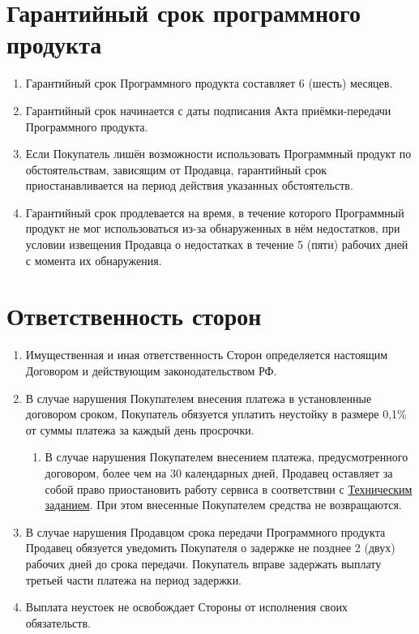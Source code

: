 \documentclass[12pt]{article}
\newcommand{\TZ}[1][Техническое задание]{\hyperref[link-tz]{#1}}
\begin{document}
\section{Гарантийный срок программного продукта}

\begin{enumerate}
    \item Гарантийный срок Программного продукта составляет 6 (шесть) месяцев.
    \item Гарантийный срок начинается с даты подписания Акта приёмки-передачи Программного продукта.
    \item Если Покупатель лишён возможности использовать Программный продукт по обстоятельствам, зависящим от Продавца, гарантийный срок приостанавливается на период действия указанных обстоятельств.
    \item Гарантийный срок продлевается на время, в течение которого Программный продукт не мог использоваться из-за обнаруженных в нём недостатков, при условии извещения Продавца о недостатках в течение 5 (пяти) рабочих дней с момента их обнаружения.
\end{enumerate}

\section{Ответственность сторон}

\begin{enumerate}
    \item Имущественная и иная ответственность Сторон определяется настоящим Договором и действующим законодательством РФ.
    \item В случае нарушения Покупателем внесения платежа в установленные договором сроком, Покупатель обязуется уплатить неустойку в размере 0,1\% от суммы платежа за каждый день просрочки.
          \begin{enumerate}
              \item В случае нарушения Покупателем внесением платежа, предусмотренного договором, более чем на 30 календарных дней, Продавец оставляет за собой право приостановить работу сервиса в соответствии с \TZ[Техническим заданием]. При этом внесенные Покупателем средства не возвращаются.
          \end{enumerate}

    \item В случае нарушения Продавцом срока передачи Программного продукта Продавец обязуется уведомить Покупателя о задержке не позднее 2 (двух) рабочих дней до срока передачи. Покупатель вправе задержать выплату третьей части платежа на период задержки.
    \item Выплата неустоек не освобождает Стороны от исполнения своих обязательств.
\end{enumerate}
\end{document}
